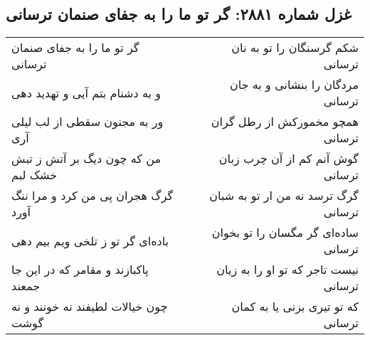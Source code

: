 \begin{center}
\section*{غزل شماره ۲۸۸۱: گر تو ما را به جفای صنمان ترسانی}
\label{sec:2881}
\begin{longtable}{l p{0.5cm} r}
گر تو ما را به جفای صنمان ترسانی
&&
شکم گرسنگان را تو به نان ترسانی
\\
و به دشنام بتم آیی و تهدید دهی
&&
مردگان را بنشانی و به جان ترسانی
\\
ور به مجنون سقطی از لب لیلی آری
&&
همچو مخمورکش از رطل گران ترسانی
\\
من که چون دیگ بر آتش ز تبش خشک لبم
&&
گوش آنم کم از آن چرب زبان ترسانی
\\
گرگ هجران پی من کرد و مرا ننگ آورد
&&
گرگ ترسد نه من ار تو به شبان ترسانی
\\
باده‌ای گر تو ز تلخی ویم بیم دهی
&&
ساده‌ای گر مگسان را تو بخوان ترسانی
\\
پاکبازند و مقامر که در این جا جمعند
&&
نیست تاجر که تو او را به زیان ترسانی
\\
چون خیالات لطیفند نه خونند و نه گوشت
&&
که تو تیری بزنی یا به کمان ترسانی
\\
\end{longtable}
\end{center}
